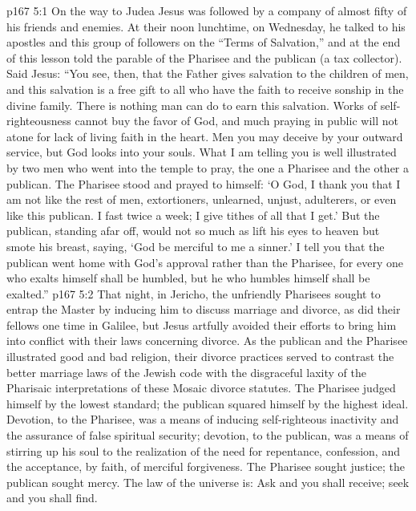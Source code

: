 \vs p167 5:1 On the way to Judea Jesus was followed by a company of almost fifty of his friends and enemies. At their noon lunchtime, on Wednesday, he talked to his apostles and this group of followers on the “Terms of Salvation,” and at the end of this lesson told the parable of the Pharisee and the publican (a tax collector). Said Jesus: \textcolor{ubdarkred}{“You see, then, that the Father gives salvation to the children of men, and this salvation is a free gift to all who have the faith to receive sonship in the divine family. There is nothing man can do to earn this salvation. Works of self\hyp{}righteousness cannot buy the favor of God, and much praying in public will not atone for lack of living faith in the heart. Men you may deceive by your outward service, but God looks into your souls. What I am telling you is well illustrated by two men who went into the temple to pray, the one a Pharisee and the other a publican. The Pharisee stood and prayed to himself: ‘O God, I thank you that I am not like the rest of men, extortioners, unlearned, unjust, adulterers, or even like this publican. I fast twice a week; I give tithes of all that I get.’ But the publican, standing afar off, would not so much as lift his eyes to heaven but smote his breast, saying, ‘God be merciful to me a sinner.’ I tell you that the publican went home with God’s approval rather than the Pharisee, for every one who exalts himself shall be humbled, but he who humbles himself shall be exalted.”}
\pc \vs p167 5:2 That night, in Jericho, the unfriendly Pharisees sought to entrap the Master by inducing him to discuss marriage and divorce, as did their fellows one time in Galilee, but Jesus artfully avoided their efforts to bring him into conflict with their laws concerning divorce. As the publican and the Pharisee illustrated good and bad religion, their divorce practices served to contrast the better marriage laws of the Jewish code with the disgraceful laxity of the Pharisaic interpretations of these Mosaic divorce statutes. The Pharisee judged himself by the lowest standard; the publican squared himself by the highest ideal. Devotion, to the Pharisee, was a means of inducing self\hyp{}righteous inactivity and the assurance of false spiritual security; devotion, to the publican, was a means of stirring up his soul to the realization of the need for repentance, confession, and the acceptance, by faith, of merciful forgiveness. The Pharisee sought justice; the publican sought mercy. The law of the universe is: Ask and you shall receive; seek and you shall find.
